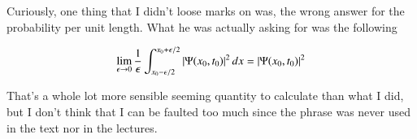 Curiously, one thing that I didn't loose marks on was, the wrong answer for the probability per unit length.  What he was actually asking for was the following

\begin{align}\label{eqn:qmIproblemSet3:1000}
\lim_{\epsilon \rightarrow 0} \frac{1}{\epsilon} \int_{x_0 - \epsilon/2}^{x_0 + \epsilon/2} \left\lvert{ \Psi(x_0, t_0) }\right\rvert^2 dx = \left\lvert{\Psi(x_0, t_0)}\right\rvert^2
\end{align}

That's a whole lot more sensible seeming quantity to calculate than what I did,  but I don't think that I can be faulted too much since the phrase was never used in the text nor in the lectures.

\EndNoBibArticle
